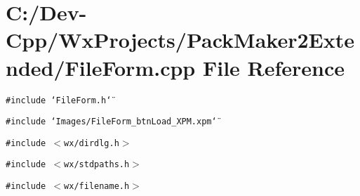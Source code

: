 \section{C:/Dev-Cpp/Wx\-Projects/Pack\-Maker2Extended/File\-Form.cpp File Reference}
\label{_file_form_8cpp}
{\tt \#include \char`\"{}File\-Form.h\char`\"{}}\par
{\tt \#include \char`\"{}Images/File\-Form\_\-btn\-Load\_\-XPM.xpm\char`\"{}}\par
{\tt \#include $<$wx/dirdlg.h$>$}\par
{\tt \#include $<$wx/stdpaths.h$>$}\par
{\tt \#include $<$wx/filename.h$>$}\par
